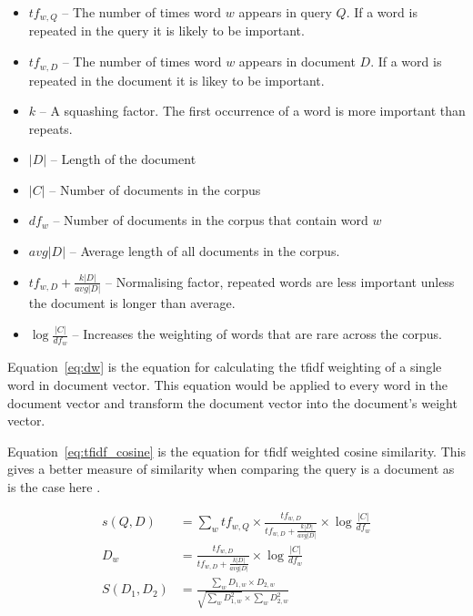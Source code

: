 \begin{itemize}
    \item $tf_{w,Q}$ -- The number of times word $w$ appears in query $Q$.  If a word is repeated in the query it is likely to be important.
    \item $tf_{w,D}$ -- The number of times word $w$ appears in document $D$.  If a word is repeated in the document it is likey to be important.
    \item $k$ -- A squashing factor.  The first occurrence of a word is more important than repeats.
    \item $|D|$ -- Length of the document
    \item $|C|$ -- Number of documents in the corpus
    \item $df_{w}$ -- Number of documents in the corpus that contain word $w$
    \item $avg|D|$ -- Average length of all documents in the corpus.
    \item $tf_{w,D} + \frac{k|D|}{avg|D|}$ -- Normalising factor, repeated words are less important unless the document is longer than average.
    \item $\log \frac{|C|}{df_{w}}$ -- Increases the weighting of words that are rare across the corpus.
\end{itemize}

Equation~\ref{eq:dw} is the equation for calculating the \ac{tfidf} weighting of a single word in document vector.  This equation would be applied to every word in the document vector and transform the document vector into the document's weight vector.

Equation~\ref{eq:tfidf_cosine} is the equation for \ac{tfidf} weighted cosine similarity.  This gives a better measure of similarity when comparing the query is a document as is the case here .

\begin{subequations}
    \begin{align}
    s(Q, D) &= \sum_{w} tf_{w,Q} \times \frac{tf_{w,D}}{tf_{w,D} + \frac{k|D|}{avg|D|}} \times \log{\frac{|C|}{df_{w}}} \label{eq:tfidf}\\
    D_{w} &= \frac{tf_{w,D}}{tf_{w,D} + \frac{k|D|}{avg|D|}} \times \log{\frac{|C|}{df_{w}}} \label{eq:dw}\\
    S(D_{1}, D_{2}) &= \frac{\sum_{w} D_{1,w} \times D_{2,w}}{\sqrt{\sum_{w} D_{1,w}^2} \times \sum_{w} D_{2,w}^2} \label{eq:tfidf_cosine}
    \end{align}
\end{subequations}

